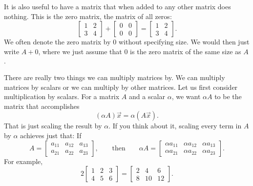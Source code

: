 It is also useful to have a matrix that when added to any other matrix
does nothing.  This is the zero matrix, the matrix of all zeros:
\begin{equation*}
\begin{bmatrix}
1 & 2 \\
3 & 4
\end{bmatrix}
+
\begin{bmatrix}
0 & 0 \\
0 & 0
\end{bmatrix}
=
\begin{bmatrix}
1 & 2 \\
3 & 4
\end{bmatrix} .
\end{equation*}
We often denote the zero matrix
by $0$ without specifying size.  We would then just write $A + 0$, where we
just assume that $0$ is the zero matrix of the same size as $A$.

\medskip

There are really two things we can multiply matrices by.  We can multiply
matrices by scalars or we can multiply by other matrices.  Let us first
consider multiplication by scalars.
For a matrix $A$ and a scalar $\alpha$, we want $\alpha A$ to be the matrix
that accomplishes
\begin{equation*}
(\alpha A) \vec{x} = \alpha (A \vec{x}) .
\end{equation*}
That is just scaling the result by $\alpha$.  If you think about it,
scaling every term in $A$ by $\alpha$ achieves just that:
If
\begin{equation*}
A =
\begin{bmatrix}
a_{11} & a_{12} & a_{13}  \\
a_{21} & a_{22} & a_{23}
\end{bmatrix},
\qquad\text{then} \qquad
\alpha A =
\begin{bmatrix}
\alpha a_{11} & \alpha a_{12} & \alpha a_{13}  \\
\alpha a_{21} & \alpha a_{22} & \alpha a_{23}
\end{bmatrix} .
\end{equation*}
For example,
\begin{equation*}
2
\begin{bmatrix}
1 & 2 & 3 \\
4 & 5 & 6
\end{bmatrix} =
\begin{bmatrix}
2 & 4 & 6 \\
8 & 10 & 12
\end{bmatrix} .
\end{equation*}

